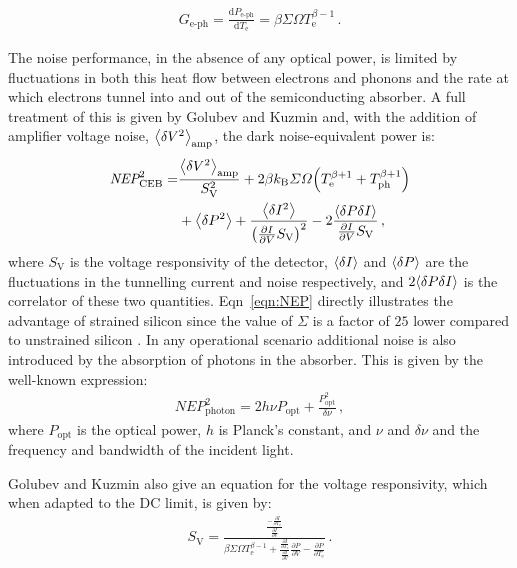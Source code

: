 \documentclass[journal, a4paper]{IEEEtran}
\renewcommand{\d}{\ensuremath{\mathrm{d}}}
\let\originalleft\left
\let\originalright\right
\renewcommand{\left}{\mathopen{}\mathclose\bgroup\originalleft}
\renewcommand{\right}{\aftergroup\egroup\originalright}
\begin{document}
\begin{align}
G_{\mathrm{e\mbox{-}ph}} = \frac{\d P_{\mathrm{e\mbox{-}ph}}}{\d T_{\mathrm{e}}}
	= \beta\varSigma\varOmega T_{\mathrm{e}}^{\beta-1}\,.
\end{align}
\par 
The noise performance, in the absence of any optical power, is limited by fluctuations in both this heat flow between electrons and phonons and the rate at which electrons tunnel into and out of the semiconducting absorber. A full treatment of this is given by Golubev and Kuzmin \cite{Golubev2001} and, with the addition of amplifier voltage noise, $\left<\delta V^{2}\right>_{\mathrm{amp}}$, the dark noise-equivalent power is:
\begin{align}
\textit{NEP}_{\mathrm{CEB}}^{2} 
	= &\frac{\left<\delta V^{2}\right>_{\mathrm{amp}}}{S_{\mathrm{V}}^{2}}
	+ 2\beta k_{\mathrm{B}}\varSigma\varOmega\left(T_{\mathrm{e}}^{\beta+1}
		+T_{\mathrm{ph}}^{\beta+1}\right)\nonumber\\
	&+\left<\delta P^{2}\right>
	+\frac{\left<\delta I^{2}\right>}
		{\left(\frac{\partial I}{\partial V}S_{\mathrm{V}}\right)^{2}}
	-2\frac{\left<\delta P \delta I\right>}
		{\frac{\partial I}{\partial V}S_{\mathrm{V}}}\,, \label{eqn:NEP}
\end{align}
where $S_{\mathrm{V}}$ is the voltage responsivity of the detector, $\left<\delta I\right>$ and $\left<\delta P\right>$ are the fluctuations in the tunnelling current and noise respectively, and $2\left<\delta P \delta I\right>$ is the correlator of these two quantities. Eqn~\ref{eqn:NEP} directly illustrates the advantage of strained silicon since the value of $\varSigma$ is a factor of $25$ lower compared to unstrained silicon \cite{Prest2011}. In any operational scenario additional noise is also introduced by the absorption of photons in the absorber. This is given by the well-known expression:
\begin{align}
\textit{NEP}_{\mathrm{photon}}^{2} = 2h\nu P_{\mathrm{opt}} 
	+ \frac{P_{\mathrm{opt}}^{2}}{\delta\nu}\,,
\label{eqn:photonNoise}
\end{align}
where $P_{\mathrm{opt}}$ is the optical power, $h$ is Planck's constant, and $\nu$ and $\delta\nu$ and the frequency and bandwidth of the incident light.
\par 
Golubev and Kuzmin \cite{Golubev2001} also give an equation for the voltage responsivity, which when adapted to the DC limit, is given by:
\begin{align}
S_{\mathrm{V}} = 
	\frac{\frac{-\frac{\partial I}{\partial T_{\mathrm{e}}}}
		{\frac{\partial I}{\partial V}}}
	{\beta\varSigma\varOmega T_{\mathrm{e}}^{\beta-1}
		+\frac{\frac{\partial I}{\partial T_{\mathrm{e}}}}
		{\frac{\partial I}{\partial V}}\frac{\partial P}{\partial V}
	-\frac{\partial P}{\partial T_{\mathrm{e}}}}\,. \label{eqn:responsivity}
\end{align}
%
\end{document}
